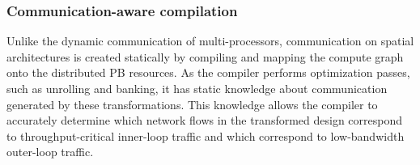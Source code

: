 \subsubsection{Communication-aware compilation}
Unlike the dynamic communication of multi-processors, communication on spatial architectures is created statically by compiling and mapping the compute graph onto the distributed PB resources.
As the compiler performs optimization passes, such as unrolling and banking, it has static knowledge about communication generated by
these transformations.
This knowledge allows the compiler to accurately determine which network flows in the transformed design correspond to throughput-critical inner-loop traffic and which correspond to low-bandwidth outer-loop traffic.

